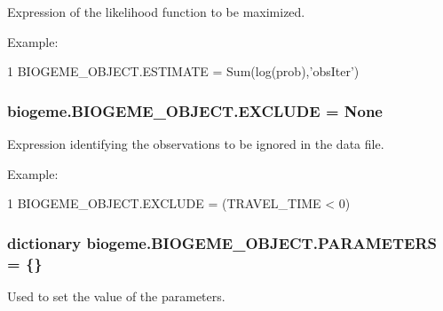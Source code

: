 Expression of the likelihood function to be maximized. 

Example\+:
\begin{DoxyCode}
1 BIOGEME\_OBJECT.ESTIMATE = Sum(log(prob),\textcolor{stringliteral}{'obsIter'}) 
\end{DoxyCode}
 \hypertarget{classbiogeme_1_1_b_i_o_g_e_m_e___o_b_j_e_c_t_a599c398c094f98e58d93b96c2dc81b97}{
\subsubsection[{E\+X\+C\+L\+U\+D\+E}]{\setlength{\rightskip}{0pt plus 5cm}biogeme.\+B\+I\+O\+G\+E\+M\+E\+\_\+\+O\+B\+J\+E\+C\+T.\+E\+X\+C\+L\+U\+D\+E = None\hspace{0.3cm}{\ttfamily [static]}}}\label{classbiogeme_1_1_b_i_o_g_e_m_e___o_b_j_e_c_t_a599c398c094f98e58d93b96c2dc81b97}


Expression identifying the observations to be ignored in the data file. 

Example\+: 
\begin{DoxyCode}
1 BIOGEME\_OBJECT.EXCLUDE = (TRAVEL\_TIME < 0)
\end{DoxyCode}
 \hypertarget{classbiogeme_1_1_b_i_o_g_e_m_e___o_b_j_e_c_t_a3f178e0954e495b10c6f08083f1ed7f7}{
\subsubsection[{P\+A\+R\+A\+M\+E\+T\+E\+R\+S}]{\setlength{\rightskip}{0pt plus 5cm}dictionary biogeme.\+B\+I\+O\+G\+E\+M\+E\+\_\+\+O\+B\+J\+E\+C\+T.\+P\+A\+R\+A\+M\+E\+T\+E\+R\+S = \{\}\hspace{0.3cm}{\ttfamily [static]}}}\label{classbiogeme_1_1_b_i_o_g_e_m_e___o_b_j_e_c_t_a3f178e0954e495b10c6f08083f1ed7f7}


Used to set the value of the parameters. 

